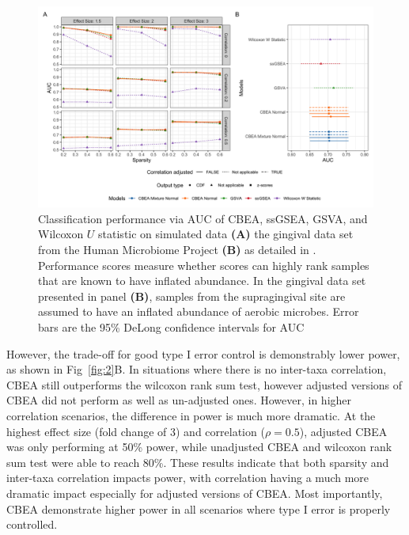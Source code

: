 \documentclass[10pt,letterpaper]{article}
\begin{document}
\begin{figure}[!h]
    \centering
    \includegraphics[width = \textwidth]{figures/sim_data_ss_auc.png}
    \caption{Classification performance via AUC of CBEA, ssGSEA, GSVA, and Wilcoxon $U$ statistic on simulated data \textbf{(A)} the gingival data set from the Human Microbiome Project  \textbf{(B)} as detailed in . Performance scores measure whether scores can highly rank samples that are known to have inflated abundance. In the gingival data set presented in panel \textbf{(B)}, samples from the supragingival site are assumed to have an inflated abundance of aerobic microbes. Error bars are the 95\% DeLong confidence intervals for AUC \cite{delong1988}} 
    \label{fig:3}
\end{figure}

However, the trade-off for good type I error control is demonstrably lower power, as shown in Fig~\ref{fig:2}B. In situations where there is no inter-taxa correlation, CBEA still outperforms the wilcoxon rank sum test, however adjusted versions of CBEA did not perform as well as un-adjusted ones. However, in higher correlation scenarios, the difference in power is much more dramatic. At the highest effect size (fold change of 3) and correlation ($\rho = 0.5$), adjusted CBEA was only performing at 50\% power, while unadjusted CBEA and wilcoxon rank sum test were able to reach 80\%. These results indicate that both sparsity and inter-taxa correlation impacts power, with correlation having a much more dramatic impact especially for adjusted versions of CBEA. Most importantly, CBEA demonstrate higher power in all scenarios where type I error is properly controlled.    
\end{document}
